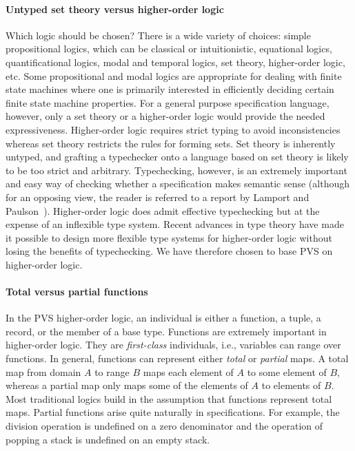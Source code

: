 \paragraph{Untyped set theory versus higher-order logic}
Which logic should be chosen?  There is a wide variety of choices:
simple propositional logics, which can be classical or intuitionistic,
equational logics, quantificational logics, modal and temporal logics,
set theory, higher-order logic, etc.  Some propositional and modal
logics are appropriate for dealing with finite state machines where one
is primarily interested in efficiently deciding certain finite state
machine properties.  For a general purpose specification language,
however, only a set theory or a higher-order logic would provide the
needed expressiveness.  Higher-order logic requires strict typing to
avoid inconsistencies whereas set theory restricts the rules for forming
sets.  Set theory is inherently untyped, and grafting a typechecker onto
a language based on set theory is likely to be too strict and arbitrary.
Typechecking, however, is an extremely important and easy way of
checking whether a specification makes semantic sense (although 
for an opposing view, the reader is referred to a report by Lamport
and Paulson~\cite{Lamport&Paulson97}).  Higher-order
logic does admit effective typechecking but at the expense of an
inflexible type system.  Recent advances in type theory have made it
possible to design more flexible type systems for higher-order logic
without losing the benefits of typechecking.  We have therefore chosen
to base PVS on higher-order logic.

\paragraph{Total versus partial functions}
 In the PVS higher-order
logic, an individual is either a function, a tuple, a record, or the
member of a base type.  Functions are extremely important in higher-order
logic.  They are \emph{first-class} individuals, i.e., variables can range
over functions.  In general, functions can represent either \emph{total}
or \emph{partial} maps.  A total map from domain $A$ to range $B$ maps
each element of $A$ to some element of $B$, whereas a partial map only
maps some of the elements of $A$ to elements of $B$.  Most traditional
logics build in the assumption that functions represent total maps.
Partial functions arise quite naturally in specifications.  For example,
the division operation is undefined on a zero denominator and the
operation of popping a stack is undefined on an empty stack.

